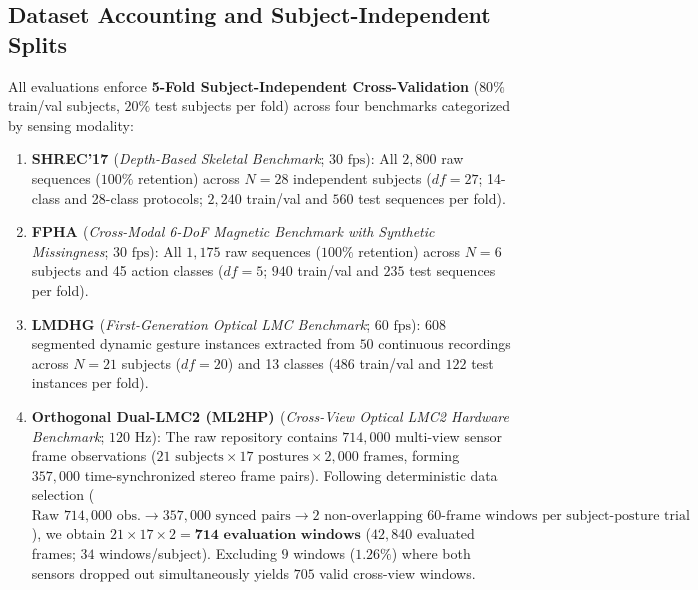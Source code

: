 \documentclass[10pt,twocolumn]{article}
\begin{document}
\subsection{Dataset Accounting and Subject-Independent Splits}
All evaluations enforce \textbf{5-Fold Subject-Independent Cross-Validation} ($80\%$ train/val subjects, $20\%$ test subjects per fold) across four benchmarks categorized by sensing modality:
\begin{enumerate}
    \item \textbf{SHREC'17 \cite{desmedt2017shrec}} (\textit{Depth-Based Skeletal Benchmark}; $30\text{ fps}$): All $2,800$ raw sequences ($100\%$ retention) across $N=28$ independent subjects ($df=27$; 14-class and 28-class protocols; $2,240$ train/val and $560$ test sequences per fold).
    \item \textbf{FPHA \cite{garcia2018first}} (\textit{Cross-Modal 6-DoF Magnetic Benchmark with Synthetic Missingness}; $30\text{ fps}$): All $1,175$ raw sequences ($100\%$ retention) across $N=6$ subjects and 45 action classes ($df=5$; $940$ train/val and $235$ test sequences per fold).
    \item \textbf{LMDHG \cite{boulahia2017dynamic}} (\textit{First-Generation Optical LMC Benchmark}; $60\text{ fps}$): $608$ segmented dynamic gesture instances extracted from $50$ continuous recordings across $N=21$ subjects ($df=20$) and 13 classes ($486$ train/val and $122$ test instances per fold).
    \item \textbf{Orthogonal Dual-LMC2 (ML2HP) \cite{gilmartin2024dual}} (\textit{Cross-View Optical LMC2 Hardware Benchmark}; $120\text{ Hz}$): The raw repository contains $714,000$ multi-view sensor frame observations ($21\text{ subjects} \times 17\text{ postures} \times 2,000\text{ frames}$, forming $357,000$ time-synchronized stereo frame pairs). Following deterministic data selection ($\text{Raw } 714,000\text{ obs.} \rightarrow 357,000\text{ synced pairs} \rightarrow 2\text{ non-overlapping } 60\text{-frame windows per subject-posture trial}$), we obtain $21 \times 17 \times 2 = \mathbf{714\text{ evaluation windows}}$ ($42,840$ evaluated frames; $34$ windows/subject). Excluding $9$ windows ($1.26\%$) where both sensors dropped out simultaneously yields $705$ valid cross-view windows.
\end{enumerate}
\end{document}
